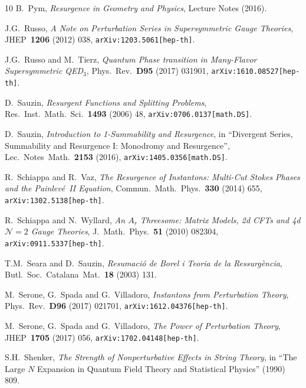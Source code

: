 \documentclass[11pt,a4paper]{article}
\begin{document}
\begin{thebibliography}{10}
B.~Pym,
\textit{Resurgence in Geometry and Physics},
Lecture Notes (2016).

J.G.~Russo,
\textit{A Note on Perturbation Series in Supersymmetric Gauge Theories},
JHEP\ \textbf{1206} (2012) 038,
\texttt{arXiv:1203.5061[hep-th]}.

J.G.~Russo and M.~Tierz,
\textit{Quantum Phase transition in Many-Flavor Supersymmetric QED$_3$},
Phys.\ Rev.\ \textbf{D95} (2017) 031901,
\texttt{arXiv:1610.08527[hep-th]}.

D.~Sauzin,
\textit{Resurgent Functions and Splitting Problems},
Res.\ Inst.\ Math.\ Sci.\ \textbf{1493} (2006) 48,
\texttt{arXiv:0706.0137[math.DS]}.

D.~Sauzin,
\textit{Introduction to 1-Summability and Resurgence},
in ``Divergent Series, Summability and Resurgence I: Monodromy and Resurgence'',
Lec.\ Notes\ Math.\ \textbf{2153} (2016),
\texttt{arXiv:1405.0356[math.DS]}.

R.~Schiappa and R.~Vaz,
\textit{The Resurgence of Instantons: Multi-Cut Stokes Phases and the Painlev\'e~II Equation},
Commun.\ Math.\ Phys.\ \textbf{330} (2014) 655,
\texttt{arXiv:1302.5138[hep-th]}.

R.~Schiappa and N.~Wyllard,
\textit{An $A_r$ Threesome: Matrix Models, 2d CFTs and 4d $\mathcal{N}=\text{2}$ Gauge Theories},
J.\ Math.\ Phys.\ \textbf{51} (2010) 082304,
\texttt{arXiv:0911.5337[hep-th]}.

T.M.~Seara and D.~Sauzin,
\textit{Resumaci\'o de Borel i Teoria de la Ressurg\`encia},
Butl.\ Soc.\ Catalana\ Mat.\ \textbf{18} (2003) 131.

M.~Serone, G.~Spada and G.~Villadoro,
\textit{Instantons from Perturbation Theory},
Phys.\ Rev.\ \textbf{D96} (2017) 021701, 
\texttt{arXiv:1612.04376[hep-th]}.

M.~Serone, G.~Spada and G.~Villadoro,
\textit{The Power of Perturbation Theory},
JHEP\ \textbf{1705} (2017) 056,
\texttt{arXiv:1702.04148[hep-th]}.

S.H.~Shenker,
\textit{The Strength of Nonperturbative Effects in String Theory},
in ``The Large $N$ Expansion in Quantum Field Theory and Statistical Physics'' (1990) 809.


\end{thebibliography}
\end{document}
